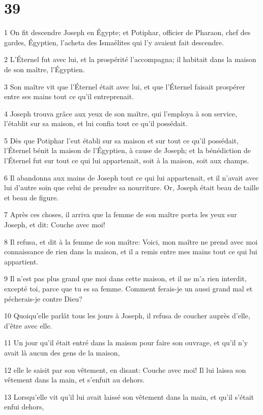 \chapter{39}

\par 1 On fit descendre Joseph en Égypte; et Potiphar, officier de Pharaon, chef des gardes, Égyptien, l'acheta des Ismaélites qui l'y avaient fait descendre.
\par 2 L'Éternel fut avec lui, et la prospérité l'accompagna; il habitait dans la maison de son maître, l'Égyptien.
\par 3 Son maître vit que l'Éternel était avec lui, et que l'Éternel faisait prospérer entre ses mains tout ce qu'il entreprenait.
\par 4 Joseph trouva grâce aux yeux de son maître, qui l'employa à son service, l'établit sur sa maison, et lui confia tout ce qu'il possédait.
\par 5 Dès que Potiphar l'eut établi sur sa maison et sur tout ce qu'il possédait, l'Éternel bénit la maison de l'Égyptien, à cause de Joseph; et la bénédiction de l'Éternel fut sur tout ce qui lui appartenait, soit à la maison, soit aux champs.
\par 6 Il abandonna aux mains de Joseph tout ce qui lui appartenait, et il n'avait avec lui d'autre soin que celui de prendre sa nourriture. Or, Joseph était beau de taille et beau de figure.
\par 7 Après ces choses, il arriva que la femme de son maître porta les yeux sur Joseph, et dit: Couche avec moi!
\par 8 Il refusa, et dit à la femme de son maître: Voici, mon maître ne prend avec moi connaissance de rien dans la maison, et il a remis entre mes mains tout ce qui lui appartient.
\par 9 Il n'est pas plus grand que moi dans cette maison, et il ne m'a rien interdit, excepté toi, parce que tu es sa femme. Comment ferais-je un aussi grand mal et pécherais-je contre Dieu?
\par 10 Quoiqu'elle parlât tous les jours à Joseph, il refusa de coucher auprès d'elle, d'être avec elle.
\par 11 Un jour qu'il était entré dans la maison pour faire son ouvrage, et qu'il n'y avait là aucun des gens de la maison,
\par 12 elle le saisit par son vêtement, en disant: Couche avec moi! Il lui laissa son vêtement dans la main, et s'enfuit au dehors.
\par 13 Lorsqu'elle vit qu'il lui avait laissé son vêtement dans la main, et qu'il s'était enfui dehors,
